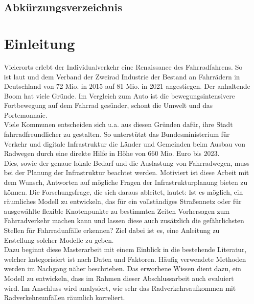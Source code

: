 \documentclass[a4paper,12pt]{thesis}
\begin{document}
\begingroup
\let\clearpage\relax
\listoffigures
\listoftables
\endgroup

\section{Abkürzungsverzeichnis}

\begin{acronym}
\end{acronym}


\chapter{Einleitung}

Vielerorts erlebt der Individualverkehr eine Renaissance des Fahrradfahrens. So ist laut \cite{Eisenberger2015} und dem Verband der Zweirad Industrie \cite{ZIV2022} der Bestand an Fahrrädern in Deutschland von 72 Mio. in 2015 auf 81 Mio. in 2021 angestiegen. Der anhaltende Boom hat viele Gründe. Im Vergleich zum Auto ist die bewegungsintensivere Fortbewegung auf dem Fahrrad gesünder, schont die Umwelt und das Portemonnaie.\\
Viele Kommunen entscheiden sich u.a. aus diesen Gründen dafür, ihre Stadt fahrradfreundlicher zu gestalten. So unterstützt das Bundesministerium für Verkehr und digitale Infrastruktur \cite{VerkehrunddigitaleInfrastruktur2020} die Länder und Gemeinden beim Ausbau von Radwegen durch eine direkte Hilfe in Höhe von 660 Mio. Euro bis 2023.\\
Dies, sowie der genaue lokale Bedarf und die Auslastung von Fahrradwegen, muss bei der Planung der Infrastruktur beachtet werden. Motiviert ist diese Arbeit mit dem Wunsch, Antworten auf mögliche Fragen der Infrastrukturplanung bieten zu können. Die Forschungsfrage, die sich daraus ableitet, lautet: Ist es möglich, ein räumliches Modell zu entwickeln, das für ein vollständiges Straßennetz oder für ausgewählte flexible Knotenpunkte zu bestimmten Zeiten Vorhersagen zum Fahrradverkehr machen kann und lassen diese auch zusätzlich die gefährlichsten Stellen für Fahrradunfälle erkennen? Ziel dabei ist es, eine Anleitung zu Erstellung solcher Modelle zu geben.\\
Dazu beginnt diese Masterarbeit mit einem Einblick in die bestehende Literatur, welcher kategorisiert ist nach Daten und Faktoren. Häufig verwendete Methoden werden im Nachgang näher beschrieben. Das erworbene Wissen dient dazu, ein Modell zu entwickeln, dass im Rahmen dieser Abschlussarbeit auch evaluiert wird. Im Anschluss wird analysiert, wie sehr das Radverkehrsaufkommen mit Radverkehrsunfällen räumlich korreliert.
\end{document}

